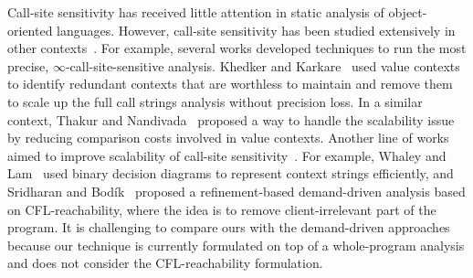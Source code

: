 Call-site sensitivity has received little attention in static analysis of object-oriented languages. 
However, call-site sensitivity has been studied extensively in other contexts~\cite{Thakur2019,Oh2014, Khedker2008,Khedker2012,Zhang2014, Sridharan2006,Sridharan2005,Dan17,Tripp2009}.
For example, several works developed techniques to run the most precise, 
$\infty$-call-site-sensitive analysis.
Khedker and Karkare~\cite{Khedker2008} used value contexts to identify 
redundant contexts that are worthless to maintain and remove them
to scale up the full call strings analysis without precision loss.
In a similar context, Thakur and Nandivada~\cite{Thakur2019} proposed a way to handle the scalability issue by reducing
comparison costs involved in value contexts.
Another line of works aimed to improve scalability of call-site
sensitivity~\cite{Whaley2004,Sridharan2006,Sridharan2005,Dan17,Xu2009}.
For example, Whaley and Lam~\cite{Whaley2004} used binary decision diagrams to represent context strings efficiently, and 
Sridharan and Bodík~\cite{Sridharan2006} proposed a refinement-based demand-driven
analysis based on CFL-reachability, where the idea is to remove client-irrelevant part of the program.
It is challenging to compare ours with the demand-driven approaches~\cite{Sridharan2006,Boomerang16} because our technique is currently formulated on top of a whole-program analysis and does not consider the CFL-reachability formulation. 


